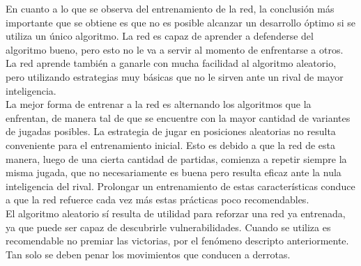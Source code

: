 \documentclass[12pt,titlepage]{article}
\begin{document}
En cuanto a lo que se observa del entrenamiento de la red, la conclusi\'on m\'as importante que se obtiene es que no es posible alcanzar un desarrollo \'optimo si se utiliza un \'unico algoritmo. La red es capaz de aprender a defenderse del algoritmo bueno, pero esto no le va a servir al momento de enfrentarse a otros. La red aprende tambi\'en a ganarle con mucha facilidad al algoritmo aleatorio, pero utilizando estrategias muy b\'asicas que no le sirven ante un rival de mayor inteligencia. \\

La mejor forma de entrenar a la red es alternando los algoritmos que la enfrentan, de manera tal de que se encuentre con la mayor cantidad de variantes de jugadas posibles. La estrategia de jugar en posiciones aleatorias no resulta conveniente para el entrenamiento inicial. Esto es debido a que la red de esta manera, luego de una cierta cantidad de partidas, comienza a repetir siempre la misma jugada, que no necesariamente es buena pero resulta eficaz ante la nula inteligencia del rival. Prolongar un entrenamiento de estas caracter\'isticas conduce a que la red refuerce cada vez m\'as estas pr\'acticas poco recomendables. \\

El algoritmo aleatorio s\'i resulta de utilidad para reforzar una red ya entrenada, ya que puede ser capaz de descubrirle vulnerabilidades. Cuando se utiliza es recomendable no premiar las victorias, por el fen\'omeno descripto anteriormente. Tan solo se deben penar los movimientos que conducen a derrotas. \\



\end{document}
